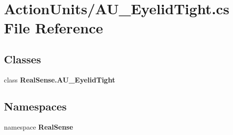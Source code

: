 \section{Action\+Units/\+A\+U\+\_\+\+Eyelid\+Tight.cs File Reference}
\label{_a_u___eyelid_tight_8cs}
\subsection*{Classes}
\begin{DoxyCompactItemize}
\item 
class \textbf{ Real\+Sense.\+A\+U\+\_\+\+Eyelid\+Tight}
\end{DoxyCompactItemize}
\subsection*{Namespaces}
\begin{DoxyCompactItemize}
\item 
namespace \textbf{ Real\+Sense}
\end{DoxyCompactItemize}
